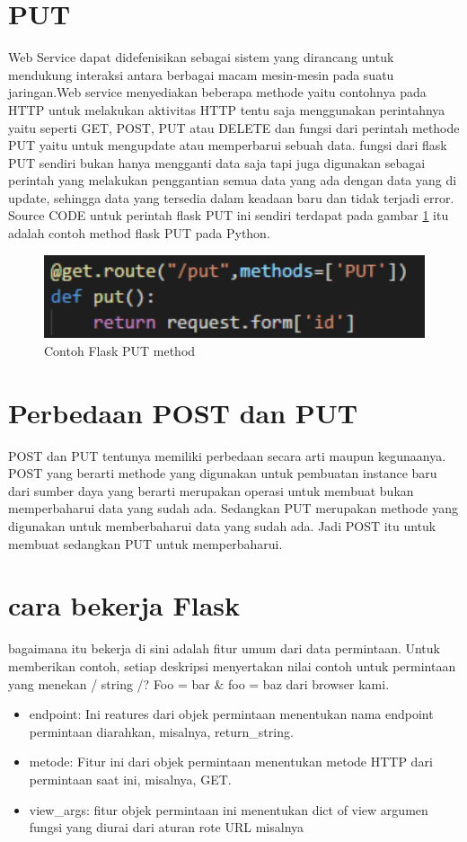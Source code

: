 \section{PUT}
Web Service dapat didefenisikan sebagai sistem yang dirancang untuk mendukung interaksi antara berbagai macam mesin-mesin pada suatu jaringan.Web service menyediakan beberapa methode yaitu contohnya pada  HTTP untuk melakukan aktivitas HTTP tentu saja menggunakan perintahnya yaitu seperti  GET, POST, PUT atau DELETE dan fungsi dari perintah methode PUT yaitu untuk mengupdate atau memperbarui sebuah data.
fungsi dari flask PUT sendiri bukan hanya mengganti data saja tapi
juga digunakan sebagai perintah yang melakukan
penggantian semua data yang ada dengan data yang di update, sehingga
data yang tersedia dalam keadaan baru dan tidak terjadi error.
Source CODE untuk perintah flask PUT ini sendiri terdapat pada gambar \ref{4PUT} 
itu adalah contoh method flask PUT pada Python.

\begin{figure}[ht]
    \centerline{\includegraphics[width=1\textwidth]{figures/3put.PNG}}
    \caption{Contoh Flask PUT method}
    \label{4PUT}
\end{figure}

\section{Perbedaan POST dan PUT}
POST dan PUT tentunya memiliki perbedaan secara arti maupun kegunaanya. POST yang berarti methode yang digunakan untuk pembuatan
instance baru dari sumber daya yang berarti merupakan operasi untuk membuat bukan memperbaharui data yang sudah ada. 
Sedangkan PUT merupakan methode yang digunakan untuk memberbaharui data yang sudah ada. Jadi POST itu untuk membuat 
sedangkan PUT untuk memperbaharui.

\section{cara bekerja Flask}
bagaimana itu bekerja
 di sini adalah fitur umum dari data permintaan. Untuk memberikan contoh, setiap deskripsi menyertakan nilai contoh untuk permintaan yang menekan / string /? Foo = bar & foo = baz dari browser kami.    
\begin{itemize}
\item endpoint: Ini reatures dari objek permintaan menentukan nama endpoint permintaan diarahkan, misalnya, return_string.    
\item metode: Fitur ini dari objek permintaan menentukan metode HTTP dari permintaan saat ini, misalnya, GET.   
\item view_args: fitur objek permintaan ini menentukan dict of view argumen fungsi yang diurai dari aturan rote URL misalnya 
\end{itemize}


